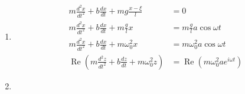 \documentclass{article}
\renewcommand{\Re}{\operatorname{Re}}
\begin{document}
\begin{enumerate}
  \item
        \begin{align*}
          m \frac{d^2 x}{d t^2} + b \frac{d x}{d t} + m g \frac{x - \xi}{l}             & = 0                                   \\
          m \frac{d^2 x}{d t^2} + b \frac{d x}{d t} + m \frac{g}{l} x                   & = m \frac{g}{l} a \cos \omega t       \\
          m \frac{d^2 x}{d t^2} + b \frac{d x}{d t} + m \omega_0^2 x                    & = m \omega_0^2 a \cos \omega t        \\
          \Re \left( m \frac{d^2 z}{d t^2} + b \frac{d z}{d t} + m \omega_0^2 z \right) & = \Re (m \omega_0^2 a e^{i \omega t})
        \end{align*}

  \item



\end{enumerate}
\end{document}
